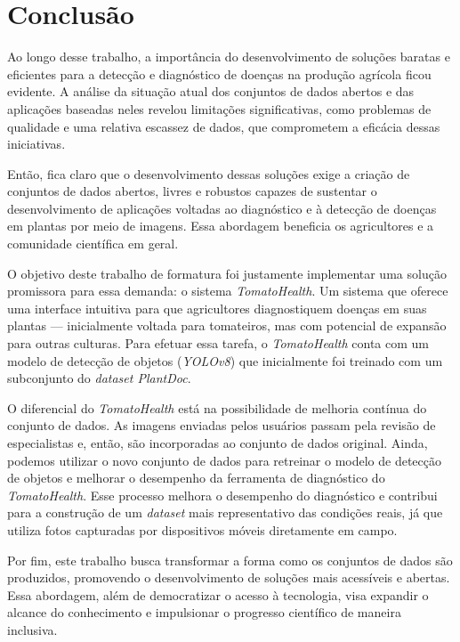 \chapter{Conclusão}
Ao longo desse trabalho, a importância do desenvolvimento de soluções baratas e eficientes para a detecção e diagnóstico de doenças na produção agrícola ficou evidente. A análise da situação atual dos conjuntos de dados abertos e das aplicações baseadas neles revelou limitações significativas, como problemas de qualidade e uma relativa escassez de dados, que comprometem a eficácia dessas iniciativas.

Então, fica claro que o desenvolvimento dessas soluções exige a criação de conjuntos de dados abertos, livres e robustos capazes de sustentar o desenvolvimento de aplicações voltadas ao diagnóstico e à detecção de doenças em plantas por meio de imagens. Essa abordagem beneficia os agricultores e a comunidade científica em geral.

O objetivo deste trabalho de formatura foi justamente implementar uma solução promissora para essa demanda: o sistema \emph{TomatoHealth}. Um sistema que oferece uma interface intuitiva para que agricultores diagnostiquem doenças em suas plantas --- inicialmente voltada para tomateiros, mas com potencial de expansão para outras culturas. Para efetuar essa tarefa, o \emph{TomatoHealth} conta com um modelo de detecção de objetos (\emph{YOLOv8}) que inicialmente foi treinado com um subconjunto do \emph{dataset PlantDoc}.

O diferencial do \emph{TomatoHealth} está na possibilidade de melhoria contínua do conjunto de dados. As imagens enviadas pelos usuários passam pela revisão de especialistas e, então, são incorporadas ao conjunto de dados original. Ainda, podemos utilizar o novo conjunto de dados para retreinar o modelo de detecção de objetos e melhorar o desempenho da ferramenta de diagnóstico do \emph{TomatoHealth}. Esse processo melhora o desempenho do diagnóstico e contribui para a construção de um \emph{dataset} mais representativo das condições reais, já que utiliza fotos capturadas por dispositivos móveis diretamente em campo.

Por fim, este trabalho busca transformar a forma como os conjuntos de dados são produzidos, promovendo o desenvolvimento de soluções mais acessíveis e abertas. Essa abordagem, além de democratizar o acesso à tecnologia, visa expandir o alcance do conhecimento e impulsionar o progresso científico de maneira inclusiva.
